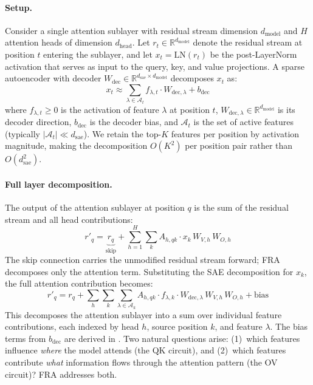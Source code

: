 \documentclass{article}
\theoremstyle{plain}
\theoremstyle{definition}
\theoremstyle{remark}
\newcommand{\Wdec}{W_{\mathrm{dec}}}
\newcommand{\dmodel}{d_{\mathrm{model}}}
\newcommand{\dhead}{d_{\mathrm{head}}}
\newcommand{\dsae}{d_{\mathrm{sae}}}
\newcommand{\RR}{\mathbb{R}}
\begin{document}
\paragraph{Setup.} Consider a single attention sublayer with residual stream dimension $\dmodel$ and $H$ attention heads of dimension $\dhead$. Let $r_t \in \RR^{\dmodel}$ denote the residual stream at position $t$ entering the sublayer, and let $x_t = \mathrm{LN}(r_t)$ be the post-LayerNorm activation that serves as input to the query, key, and value projections. A sparse autoencoder with decoder $\Wdec \in \RR^{\dsae \times \dmodel}$ decomposes $x_t$ as:
\begin{equation}
    x_t \approx \sum_{\lambda \in \mathcal{A}_t} f_{\lambda,t} \cdot W_{\mathrm{dec},\lambda} + b_{\mathrm{dec}}
    \label{eq:sae}
\end{equation}
where $f_{\lambda,t} \geq 0$ is the activation of feature $\lambda$ at position $t$, $W_{\mathrm{dec},\lambda} \in \RR^{\dmodel}$ is its decoder direction, $b_{\mathrm{dec}}$ is the decoder bias, and $\mathcal{A}_t$ is the set of active features (typically $|\mathcal{A}_t| \ll \dsae$). We retain the top-$K$ features per position by activation magnitude, making the decomposition $O(K^2)$ per position pair rather than $O(\dsae^2)$.

\paragraph{Full layer decomposition.} The output of the attention sublayer at position $q$ is the sum of the residual stream and all head contributions:
\begin{equation}
    r'_q = \underbrace{r_q}_{\text{skip}} + \sum_{h=1}^{H} \sum_{k} A_{h,qk} \cdot x_k\,W_{V,h}\,W_{O,h}
    \label{eq:full_layer}
\end{equation}
The skip connection carries the unmodified residual stream forward; FRA decomposes only the attention term. Substituting the SAE decomposition for $x_k$, the full attention contribution becomes:
\begin{equation}
    r'_q = r_q + \sum_{h} \sum_{k} \sum_{\lambda \in \mathcal{A}_k} A_{h,qk} \cdot f_{\lambda,k} \cdot W_{\mathrm{dec},\lambda}\,W_{V,h}\,W_{O,h} + \text{bias}
    \label{eq:full_decomp}
\end{equation}
This decomposes the attention sublayer into a sum over individual feature contributions, each indexed by head $h$, source position $k$, and feature $\lambda$. The bias terms from $b_{\mathrm{dec}}$ are derived in . Two natural questions arise: (1)~which features influence \emph{where} the model attends (the QK circuit), and (2)~which features contribute \emph{what} information flows through the attention pattern (the OV circuit)? FRA addresses both.
\end{document}
